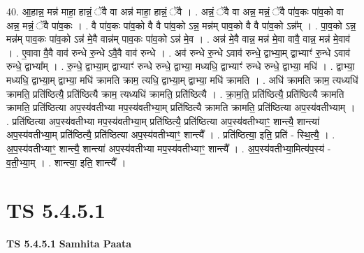 \documentclass[17pt]{extarticle}
\begin{document}
40. आ॒हान्न॒ मन्न॑ माहा॒ हान्नं॒ ॅवै वा अन्न॑ माहा॒ हान्नं॒ ॅवै । . अन्नं॒ ॅवै वा अन्न॒ मन्नं॒ ॅवै पा॑व॒कः पा॑व॒को वा अन्न॒ मन्नं॒ ॅवै पा॑व॒कः । . वै पा॑व॒कः पा॑व॒को वै वै पा॑व॒को ऽन्न॒ मन्न॑म् पाव॒को वै वै पा॑व॒को ऽन्न᳚म् । . पा॒व॒को ऽन्न॒ मन्न॑म् पाव॒कः पा॑व॒को ऽन्न॑ मे॒वै वान्न॑म् पाव॒कः पा॑व॒को ऽन्न॑ मे॒व । . अन्न॑ मे॒वै वान्न॒ मन्न॑ मे॒वा वावै॒ वान्न॒ मन्न॑ मे॒वाव॑ । . ए॒वावा वै॒वै वाव॑ रुन्धे रु॒न्धे ऽवै॒वै वाव॑ रुन्धे । . अव॑ रुन्धे रु॒न्धे ऽवाव॑ रुन्धे॒ द्वाभ्या॒म् द्वाभ्याꣳ॑ रु॒न्धे ऽवाव॑ रुन्धे॒ द्वाभ्या᳚म् । . रु॒न्धे॒ द्वाभ्या॒म् द्वाभ्याꣳ॑ रुन्धे रुन्धे॒ द्वाभ्या॒ मध्यधि॒ द्वाभ्याꣳ॑ रुन्धे रुन्धे॒ द्वाभ्या॒ मधि॑ । . द्वाभ्या॒ मध्यधि॒ द्वाभ्या॒म् द्वाभ्या॒ मधि॑ क्रामति क्राम॒ त्यधि॒ द्वाभ्या॒म् द्वाभ्या॒ मधि॑ क्रामति । . अधि॑ क्रामति क्राम॒ त्यध्यधि॑ क्रामति॒ प्रति॑ष्ठित्यै॒ प्रति॑ष्ठित्यै क्राम॒ त्यध्यधि॑ क्रामति॒ प्रति॑ष्ठित्यै । . क्रा॒म॒ति॒ प्रति॑ष्ठित्यै॒ प्रति॑ष्ठित्यै क्रामति क्रामति॒ प्रति॑ष्ठित्या अप॒स्य॑वतीभ्या मप॒स्य॑वतीभ्या॒म् प्रति॑ष्ठित्यै क्रामति क्रामति॒ प्रति॑ष्ठित्या अप॒स्य॑वतीभ्याम् । . प्रति॑ष्ठित्या अप॒स्य॑वतीभ्या मप॒स्य॑वतीभ्या॒म् प्रति॑ष्ठित्यै॒ प्रति॑ष्ठित्या अप॒स्य॑वतीभ्याꣳ॒॒ शान्त्यै॒ शान्त्या॑ अप॒स्य॑वतीभ्या॒म् प्रति॑ष्ठित्यै॒ प्रति॑ष्ठित्या अप॒स्य॑वतीभ्याꣳ॒॒ शान्त्यै᳚ । . प्रति॑ष्ठित्या॒ इति॒ प्रति॑ - स्थि॒त्यै॒ । . अ॒प॒स्य॑वतीभ्याꣳ॒॒ शान्त्यै॒ शान्त्या॑ अप॒स्य॑वतीभ्या मप॒स्य॑वतीभ्याꣳ॒॒ शान्त्यै᳚ । . अ॒प॒स्य॑वतीभ्या॒मित्य॑प॒स्य॑ - व॒ती॒भ्या॒म् । . शान्त्या॒ इति॒ शान्त्यै᳚ । \newline
\pagebreak
{}

\section{ TS 5.4.5.1 }

\textbf{TS 5.4.5.1 } \newline
\textbf{Samhita Paata} \newline
\end{document}
